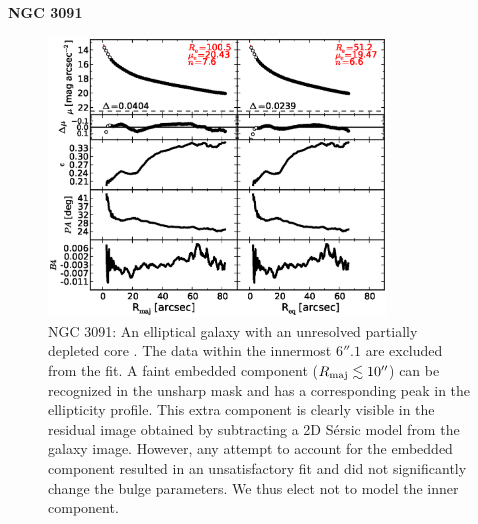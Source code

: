 \documentclass[preprint2]{emulateapj}
\newcommand{\fitfigurewidth}{0.8\textwidth}
\begin{document}
  \clearpage\newpage\noindent
  {\bf NGC 3091 \\}

  \begin{figure}[h]
  \begin{center}
  \includegraphics[width=\fitfigurewidth]{n3091_1Dfit.eps}
  \caption{NGC 3091: 
  An elliptical galaxy with an unresolved partially depleted core \citep{rusli2013}. %
  The data within the innermost $6''.1$ are excluded from the fit.
  A faint embedded component ($R_{\rm maj} \lesssim 10''$) can be recognized in the unsharp mask and has a corresponding peak in the
  ellipticity profile.
  This extra component is clearly visible in the residual image obtained by subtracting a 2D S\'ersic model from the  
  galaxy image.
  However, any attempt to account for the embedded component resulted in an unsatisfactory fit and did not 
  significantly change the bulge parameters.
  We thus elect not to model the inner component. 
  }
  \end{center}
  \end{figure}
\end{document}
